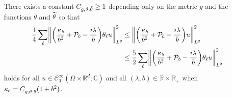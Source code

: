 \documentclass[AHL,Unicode,longabstracts]{cedram}
\newcommand{\C}{\mathbb{C}}
\newcommand{\R}{\mathbb{R}}
\newcommand{\clC}{\mathcal{C}}
\newcommand{\clP}{\mathcal{P}}
\newcommand\norm[1]{\left\lVert#1\right\rVert}
\let\oldtilde\tilde
\renewcommand*{\tilde}[1]{\mathchoice{\widetilde{#1}}{\widetilde{#1}}{\oldtilde{#1}}{\oldtilde{#1}}}
\let\originalleft\left
\let\originalright\right
\renewcommand{\left}{\mathopen{}\mathclose\bgroup\originalleft}
\renewcommand{\right}{\aftergroup\egroup\originalright}
\begin{document}
\begin{prop}\label{pr:equivNormAfterDyadicPartition}
There exists a constant $C_{g,\theta, \tilde{\theta}}\geq 1$ depending only on the metric $g$ and the functions $\theta$ and $\tilde{\theta}$ so that
\begin{equation}
\label{eq:EquivDyadicPartition}
\begin{aligned}[t]
\frac{1}{4} \sum_{\ell} \norm{\left(\frac{\kappa_{b}}{b^{2}}+\clP_{b}-\frac{i\lambda}{b} \right) \theta_{\ell} u}_{L^2}^{2}
&\leq \norm{\left(\frac{\kappa_{b}}{b^{2}}+\clP_{b}-\frac{i\lambda}{b}\right) u}^{2}_{L^2}
\\
&\leq \frac{5}{2}\sum_{\ell} \norm{\left(\frac{\kappa_{b}}{b^{2}}+\clP_{b}-\frac{i\lambda}{b}\right) \theta_{\ell} u}^{2}_{L^2}
\end{aligned}
\end{equation}
holds for all $u\in \clC^\infty_0(\Omega\times\R^d;\C)$ and all $(\lambda,b)\in \R\times \R_+$ when $\kappa_b = C_{g,\theta, \tilde{\theta}}(1+b^2)$.
\end{prop}
\end{document}
